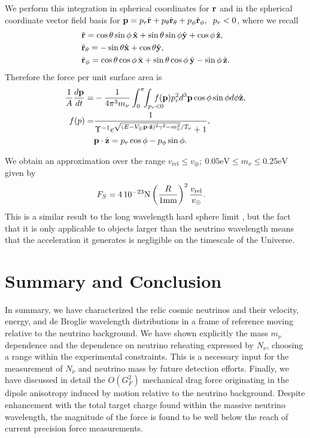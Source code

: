 We perform this integration in spherical coordinates for ${\bf r}$ and in the spherical coordinate vector field basis for ${\bf p}=p_r\hat{\bf r} +p_\theta\hat{\bf r}_\theta+p_\phi\hat{\bf r}_\phi,\hspace{2mm} p_r<0$, where we recall
\begin{align}
&\hat{\bf r}=\cos  \theta \sin \phi \, \hat{\bf x}+\sin \theta \sin \phi \hat{\bf y}+\cos  \phi\,\hat{\bf z}\notag,\\
&\hat{\bf r}_\theta=-\sin \theta \hat{\bf x}+\cos \theta \hat{\bf y},\\
&\hat{\bf r}_\phi=\cos \theta \cos \phi\,\hat{\bf x}+\sin \theta \cos \phi \,\hat{\bf y}-\sin \phi \, \hat{\bf z}\notag.
\end{align}
Therefore the force per unit surface area is
\begin{align}\label{drag_eq}
\frac{1}{A}\frac{d{\bf p}}{dt}=&-\frac{1}{4\pi^3 m_\nu}\int_0^\pi\!\!\int_{p_r<0}\!\!\!\!\!\!\!\! f({\bf p}) p_r^2  d^3{\bf p}\cos \phi \sin \phi  d\phi\hat{\bf z},\notag\\
f({\bf}p)=&\frac{1}{  \Upsilon^{-1}e^{\sqrt{( E-V_\oplus {\bf p}\cdot \hat {\bf z})^2\gamma^2-m_\nu^2}/T_\nu}+1 },\\
          &{\bf p}\cdot\hat{\bf z}=p_r\cos \phi-p_\phi\sin\phi .\notag
\end{align}

We obtain an approximation over the range $v_{\text{rel}}\leq v_\oplus ;\ 0.05\text{eV}\leq m_\nu\leq 0.25\text{eV}$ given by
\begin{align}\label{drag_fit}
&F_S =  4\,10^{-23} \text{N}\left(\frac{R}{1{\rm mm}}\right)^2\frac{v_{\text{rel}}}{ v_\oplus}.
\end{align}
This is a similar result to the long wavelength hard sphere limit , but the fact that it is only applicable to objects larger than the neutrino wavelength means that the acceleration it generates is negligible on the timescale of the Universe.


 
\section{Summary and Conclusion}
In summary, we have characterized the relic cosmic neutrinos and their velocity, energy, and de Broglie wavelength distributions in a frame of reference moving relative to the neutrino background. We have shown explicitly the mass $m_\nu$ dependence and the dependence on neutrino reheating expressed by $N_\nu$, choosing a range within the experimental constraints. This is a necessary input for the measurement of $N_\nu$ and neutrino mass by future detection efforts.  Finally, we have discussed in detail the $O(G_F^2)$ mechanical drag force  originating in the dipole anisotropy induced by motion relative to the neutrino background.  Despite enhancement with the total target charge found within the massive neutrino wavelength, the magnitude of the force is found to be well below the reach of current  precision force measurements.

